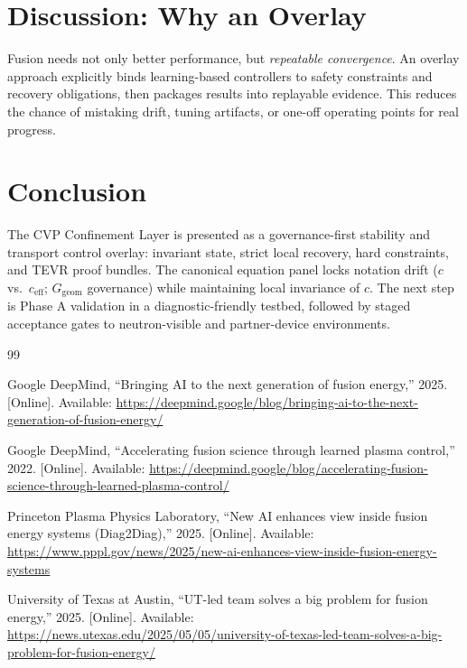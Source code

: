\documentclass[conference]{IEEEtran}
\newcommand{\cEff}{c_{\mathrm{eff}}}
\newcommand{\Ggeom}{G_{\mathrm{geom}}}
\begin{document}
\section{Discussion: Why an Overlay}
Fusion needs not only better performance, but \emph{repeatable convergence}.
An overlay approach explicitly binds learning-based controllers to safety constraints and recovery obligations, then packages results into replayable evidence.
This reduces the chance of mistaking drift, tuning artifacts, or one-off operating points for real progress.

\section{Conclusion}
The CVP Confinement Layer is presented as a governance-first stability and transport control overlay: invariant state, strict local recovery, hard constraints, and TEVR proof bundles.
The canonical equation panel locks notation drift ($c$ vs.\ $\cEff$; $\Ggeom$ governance) while maintaining local invariance of $c$.
The next step is Phase A validation in a diagnostic-friendly testbed, followed by staged acceptance gates to neutron-visible and partner-device environments.

\begin{thebibliography}{99}

Google DeepMind, ``Bringing AI to the next generation of fusion energy,'' 2025. [Online]. Available: \url{https://deepmind.google/blog/bringing-ai-to-the-next-generation-of-fusion-energy/}

Google DeepMind, ``Accelerating fusion science through learned plasma control,'' 2022. [Online]. Available: \url{https://deepmind.google/blog/accelerating-fusion-science-through-learned-plasma-control/}

Princeton Plasma Physics Laboratory, ``New AI enhances view inside fusion energy systems (Diag2Diag),'' 2025. [Online]. Available: \url{https://www.pppl.gov/news/2025/new-ai-enhances-view-inside-fusion-energy-systems}

University of Texas at Austin, ``UT-led team solves a big problem for fusion energy,'' 2025. [Online]. Available: \url{https://news.utexas.edu/2025/05/05/university-of-texas-led-team-solves-a-big-problem-for-fusion-energy/}

\end{thebibliography}
\end{document}
